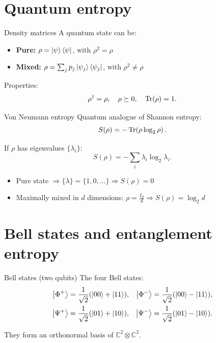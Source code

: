 \documentclass{beamer}
\begin{document}
\section{Quantum entropy}

\begin{frame}{Density matrices}
A quantum state can be:
\begin{itemize}
    \item \textbf{Pure:} $\rho = \ket{\psi}\bra{\psi}$, with $\rho^2=\rho$
    \item \textbf{Mixed:} $\rho=\sum_j p_j\ket{\psi_j}\bra{\psi_j}$, with $\rho^2\neq \rho$
\end{itemize}

Properties:
\[
\rho^\dagger=\rho,\quad \rho\succeq 0,\quad \Tr(\rho)=1.
\]
\end{frame}

\begin{frame}{Von Neumann entropy}
Quantum analogue of Shannon entropy:
\[
S(\rho) = -\Tr\!\left(\rho \log_2 \rho\right).
\]

If $\rho$ has eigenvalues $\{\lambda_i\}$:
\[
S(\rho)= -\sum_i \lambda_i \log_2 \lambda_i.
\]

\begin{itemize}
    \item Pure state $\Rightarrow \{\lambda\}=\{1,0,\dots\} \Rightarrow S(\rho)=0$
    \item Maximally mixed in $d$ dimensions: $\rho=\frac{I_d}{d} \Rightarrow S(\rho)=\log_2 d$
\end{itemize}
\end{frame}

\section{Bell states and entanglement entropy}

\begin{frame}{Bell states (two qubits)}
The four Bell states:
\begin{align*}
\ket{\Phi^+} &= \frac{1}{\sqrt{2}}(\ket{00}+\ket{11}), &
\ket{\Phi^-} &= \frac{1}{\sqrt{2}}(\ket{00}-\ket{11}),\\
\ket{\Psi^+} &= \frac{1}{\sqrt{2}}(\ket{01}+\ket{10}), &
\ket{\Psi^-} &= \frac{1}{\sqrt{2}}(\ket{01}-\ket{10}).
\end{align*}

They form an orthonormal basis of $\mathbb{C}^2\otimes \mathbb{C}^2$.
\end{frame}
\end{document}
